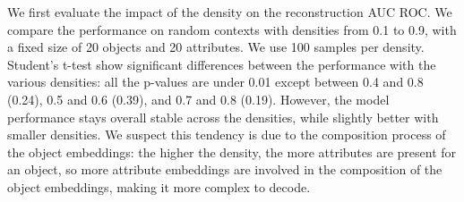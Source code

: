 
We first evaluate the impact of the density on the reconstruction AUC ROC.
We compare the performance on random contexts with densities from 0.1 to 0.9, with a fixed size of 20 objects and 20 attributes.
We use 100 samples per density.
Student's t-test show significant differences between the performance with the various densities: all the p-values are under 0.01 except between 0.4 and 0.8 (0.24), 0.5 and 0.6 (0.39), and 0.7 and 0.8 (0.19).
However, the model performance stays overall stable across the densities, while slightly better with smaller densities.
We suspect this tendency is due to the composition process of the object embeddings: the higher the density, the more attributes are present for an object, so more attribute embeddings are involved in the composition of the object embeddings, making it more complex to decode.

